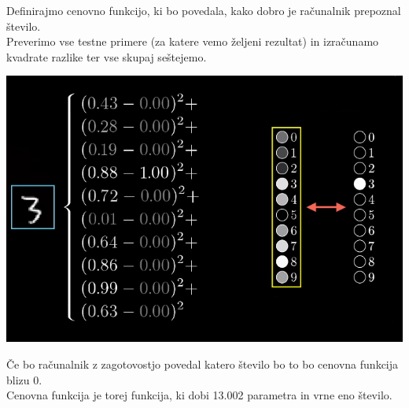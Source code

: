 \documentclass{beamer}
\begin{document}
\begin{frame}{}
Definirajmo cenovno funkcijo, ki bo povedala, kako dobro je računalnik prepoznal število.\\
\smallskip
Preverimo vse testne primere (za katere vemo željeni rezultat) in izračunamo kvadrate razlike ter vse skupaj seštejemo.
\smallskip
\begin{center}
\includegraphics[scale = 0.35]{photo/2foto3} \\
\end{center}
\smallskip
Če bo računalnik z zagotovostjo povedal katero število bo to bo cenovna funkcija blizu 0. \\
\smallskip
Cenovna funkcija je torej funkcija, ki dobi 13.002 parametra in vrne eno število.
\end{frame}
 
\end{document}
